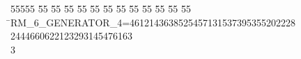 %
%
\begin{tabbing}
55555 \= 55 \= 55 \= 55 \= 55 \= 55 \= 55 \= 55 \= 55 \= 55 \= 55 \= 55 \= 55 \= \>RM\_6\_GENERATOR\_4=4612143638525457131537395355202228\\[0pt]
2444660622123293145476163\\[0pt]
3\>\end{tabbing}
